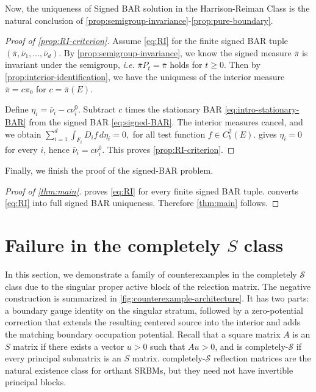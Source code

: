 \documentclass[aihp]{imsart}
\numberwithin{equation}{section}
\theoremstyle{plain}
\theoremstyle{definition}
\newcommand{\1}{\mathbf 1}
\begin{document}
Now, the uniqueness of Signed BAR solution in the Harrison-Reiman Class is the natural conclusion of \cref{prop:semigroup-invariance}-\cref{prop:pure-boundary}.

\begin{proof}[Proof of \cref{prop:RI-criterion}]
Assume \eqref{eq:RI} for the finite signed BAR tuple $(\bar\pi,\bar\nu_1,\ldots,\bar\nu_d)$. By \cref{prop:semigroup-invariance}, we know the signed measure $\bar\pi$ is invariant under the semigroup, \emph{i.e.} $\bar\pi P_t=\bar\pi$ holds for $t\ge 0$. Then by \cref{prop:interior-identification}, we have the uniquness of the interior measure $\bar\pi=c\pi_0$ for $c=\bar\pi(E)$.

Define $\eta_i=\bar\nu_i-c\nu_i^0.$ Subtract $c$ times the stationary BAR \eqref{eq:intro-stationary-BAR} from the signed BAR \eqref{eq:signed-BAR}. The interior measures cancel, and we obtain $\sum_{i=1}^d\int_{F_i}D_i f\,d\eta_i=0,$ for all test function $f\in C_b^2(E).$  gives $\eta_i=0$ for every $i$, hence $\bar\nu_i=c\nu_i^0$. This proves \cref{prop:RI-criterion}.
\end{proof}

Finally, we finish the proof of the signed-BAR problem.
\begin{proof}[Proof of \cref{thm:main}]
 proves \eqref{eq:RI} for every finite signed BAR tuple.  converts \eqref{eq:RI} into full signed BAR uniqueness. Therefore \cref{thm:main} follows.
\end{proof}

\section{Failure in the completely \texorpdfstring{$S$}{S} class}\label{sec:sharpness}


In this section, we demonstrate a family of counterexamples in the completely $\mathcal{S}$ class due to the singular proper active block of the relection matrix. The negative construction is summarized in \cref{fig:counterexample-architecture}.  It has two parts: a boundary gauge identity on the singular stratum, followed by a zero-potential correction that extends the resulting centered source into the interior and adds the matching boundary occupation potential. Recall that a square matrix $A$ is an $S$ matrix if there exists a vector $u>0$ such that $Au>0$, and is completely-$\mathcal{S}$ if every principal submatrix is an $S$ matrix. completely-$\mathcal{S}$ reflection matrices are the natural existence class for orthant SRBMs, but they need not have invertible principal blocks.
\end{document}
